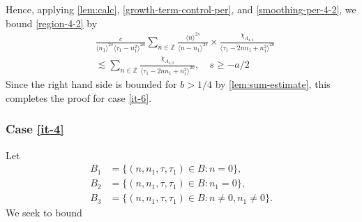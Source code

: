 \documentclass[12pt,reqno]{amsart}
\numberwithin{equation}{section}  %
\numberwithin{figure}{section}
\newcommand{\zz}{\mathbb{Z}}
\theoremstyle{plain}
\theoremstyle{definition}
\theoremstyle{remark}
\begin{document}
Hence, applying
\autoref{lem:calc}, \eqref{growth-term-control-per}, and
\eqref{smoothing-per-4-2}, we bound \eqref{region-4-2} by
%
%
\begin{equation*}
\begin{split}
&  \frac{c}{\langle n_{1} \rangle ^{2s}
  \langle \tau_{1} - n_{1}^{2} \rangle
  ^{2a}} \sum_{n \in \zz} \frac{\langle n \rangle ^{2s}}{\langle
  n - n_{1}\rangle ^{2s}}  \times \frac{\chi_{A_{4,2}}}{\langle
  \tau_{1} - 2nn_{1} + n_{1}^{2} \rangle ^{2b}} 
  \\
  & \lesssim 
  \sum_{n \in \zz} \frac{\chi_{A_{4,2}}}{\langle
  \tau_{1} - 2nn_{1} + n_{1}^{2} \rangle ^{2b}},
  \quad  s \ge -a/2
  \end{split}
\end{equation*}
%
%
Since the right hand side is bounded for $b > 1/4$ by \autoref{lem:sum-estimate}, this
completes the proof for case \eqref{it-6}.
\subsubsection{Case \eqref{it-4}} 
\label{sssec:case-it-4}
Let 
%
%
\begin{align*}
B_1&=\{(n, n_1, \tau, \tau_1)\in B: n=0\},\\
B_2&=\{(n, n_1, \tau, \tau_1)\in B: n_1 = 0 \},\\
B_3&=\{(n, n_1, \tau, \tau_1)\in B: n \neq 0, n_1 \neq 0 \}.
\end{align*} 
%
%
We seek to bound
\end{document}
